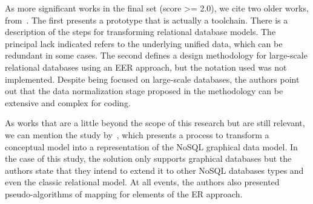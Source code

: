 As more significant works in the final set (score >= 2.0), we cite two older works, from~\cite{Rosenthal:1994, Teorey:1986}.
The first presents a prototype that is actually a toolchain.
There is a description of the steps for transforming relational database models.
The principal lack indicated refers to the underlying unified data, which can be redundant in some cases.
The second defines a design methodology for large-scale relational databases using an EER approach, but the notation used was not implemented.
Despite being focused on large-scale databases, the authors point out that the data normalization stage proposed in the methodology can be extensive and complex for coding.


As works that are a little beyond the scope of this research but are still relevant, we can mention the study by~\cite{deSousa:2018}, which presents a process to transform a conceptual model into a representation of the NoSQL graphical data model.
In the case of this study, the solution only supports graphical databases but the authors state that they intend to extend it to other NoSQL databases types and even the classic relational model.
At all events, the authors also presented pseudo-algorithms of mapping for elements of the ER approach.


